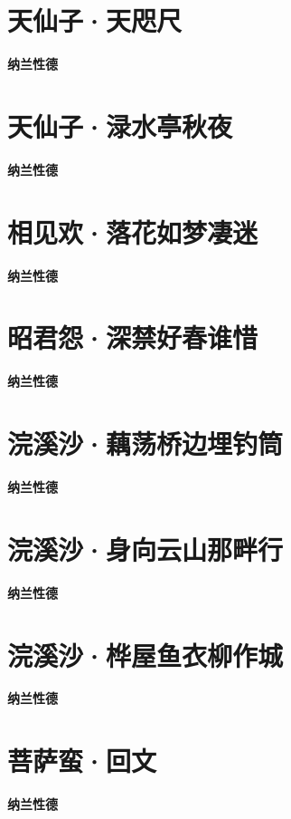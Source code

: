\documentclass[12pt,a4paper]{ctexbook}
\begin{document}
\section{天仙子·天咫尺}
\textbf{纳兰性德}\par\vspace{0.5em}

\section{天仙子·渌水亭秋夜}
\textbf{纳兰性德}\par\vspace{0.5em}

\section{相见欢·落花如梦凄迷}
\textbf{纳兰性德}\par\vspace{0.5em}

\section{昭君怨·深禁好春谁惜}
\textbf{纳兰性德}\par\vspace{0.5em}

\section{浣溪沙·藕荡桥边埋钓筒}
\textbf{纳兰性德}\par\vspace{0.5em}

\section{浣溪沙·身向云山那畔行}
\textbf{纳兰性德}\par\vspace{0.5em}

\section{浣溪沙·桦屋鱼衣柳作城}
\textbf{纳兰性德}\par\vspace{0.5em}

\section{菩萨蛮·回文}
\textbf{纳兰性德}\par\vspace{0.5em}
\end{document}
